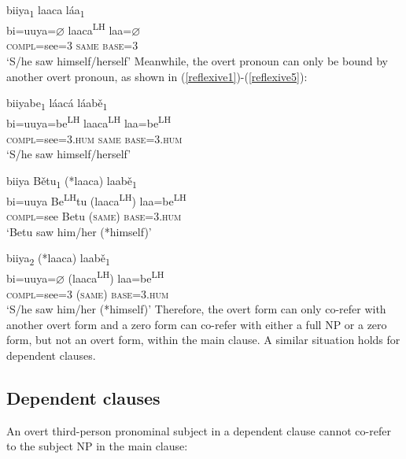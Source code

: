 \ea\label{reflexive2} 
\glll biiya\textsubscript{1} laaca l\'{a}a\textsubscript{1} \\
bi=uuya={$\varnothing$} laaca\textsuperscript{LH} laa={$\varnothing$} \\
\textsc{compl}=see=\textsc{3} \textsc{same} \textsc{base}=\textsc{3} \\
\glt `S/he saw himself/herself'
\z
Meanwhile, the overt pronoun can only be bound by another overt pronoun, as shown in (\ref{reflexive1})-(\ref{reflexive5}):

\ea\label{reflexive1}
\glll biiyabe\textsubscript{1} l\'{a}ac\'{a} l\'{a}ab\v{e}\textsubscript{1} \\
bi=uuya=be\textsuperscript{LH}  laaca\textsuperscript{LH} laa=be\textsuperscript{LH}  \\
\textsc{compl}=see=\textsc{3.hum} \textsc{same} \textsc{base}=\textsc{3.hum} \\
\glt `S/he saw himself/herself'
\z

\ea\label{reflexive4}
\glll biiya B\v{e}tu\textsubscript{1} (*laaca) laab\v{e}\textsubscript{1} \\
bi=uuya Be\textsuperscript{LH}tu (laaca\textsuperscript{LH}) laa=be\textsuperscript{LH}  \\
\textsc{compl}=see Betu (\textsc{same}) \textsc{base}=\textsc{3.hum} \\
\glt `Betu saw him/her (*himself)'
\z

\ea\label{reflexive5}
\glll biiya\textsubscript{2} (*laaca) laab\v{e}\textsubscript{1} \\
bi=uuya={$\varnothing$} (laaca\textsuperscript{LH}) laa=be\textsuperscript{LH}  \\
\textsc{compl}=see=\textsc{3} (\textsc{same}) \textsc{base}=\textsc{3.hum} \\
\glt `S/he saw him/her (*himself)'
\z
Therefore, the overt form can only co-refer with another overt form and a zero form can co-refer with either a full NP or a zero form, but not an overt form, within the main clause. A similar situation holds for dependent clauses.


\subsection{Dependent clauses}

An overt third-person pronominal subject in a dependent clause cannot co-refer to the subject NP in the main clause:

